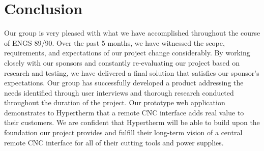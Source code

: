\documentclass[12pt,letterpaper,titlepage]{article}
\begin{document}
\section{Conclusion} \label{sec:Conclusion}

Our group is very pleased with what we have accomplished throughout the course of ENGS 89/90. Over the past 5 months, we have witnessed the scope, requirements, and expectations of our project change considerably. By working closely with our sponsors and constantly re-evaluating our project based on research and testing, we have delivered a final solution that satisfies our sponsor's expectations. Our group has successfully developed a product addressing the needs identified through user interviews and thorough research conducted throughout the duration of the project. Our prototype web application demonstrates to Hypertherm that a remote CNC interface adds real value to their customers. We are confident that Hypertherm will be able to build upon the foundation our project provides and fulfill their long-term vision of a central remote CNC interface for all of their cutting tools and power supplies.
\end{document}
